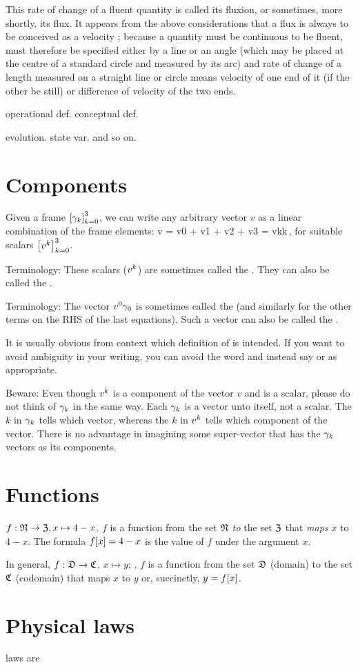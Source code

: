 This rate of change of a fluent quantity is called its fluxion, or sometimes, more shortly, its flux. It appears from the above considerations that a flux is always to be conceived as a velocity ; because a quantity must be continuous to be fluent, must therefore be specified either by a line or an angle (which may be placed at the centre of a standard circle and measured by its arc) and rate of change of a length measured on a straight line or circle means velocity of one end of it (if the other be still) or difference of velocity of the two ends.

operational def. conceptual def.

evolution. state var. and so on.


\section{Components}
%
Given a frame $\left[{\gamma_{k}}\right]_{k = 0}^{3}$, we can write any arbitrary vector $v$ as a linear combination of the frame elements:
%
\beq
  v = \ivec v0 + \ivec v1 + \ivec v2 + \ivec v3
    = \ivec vk\ifvec k\,,
\eeq
%
for suitable scalars $\left[{{v}^{k}}\right]_{k = 0}^{3}$.

Terminology: These scalars (${v}^{k}$) are sometimes called the . They can also be called the .

Terminology: The vector ${v}^{0}\gamma_{0}$ is sometimes called the  (and similarly for the other terms on the RHS of the last equations). Such a vector can also be called the .

It is usually obvious from context which definition of  is intended. If you want to avoid ambiguity in your writing, you can avoid the word  and instead say  or  as appropriate.

Beware: Even though ${v}^{k}$ is a component of the vector $v$ and is a scalar, please do not think of $\gamma_{k}$ in the same way. Each $\gamma_{k}$ is a vector unto itself, not a scalar. The $k$ in $\gamma_{k}$ tells which vector, whereas the $k$ in ${v}^{k}$ tells which component of the vector. There is no advantage in imagining some super-vector that has the $\gamma_{k}$ vectors as its components.


\section{Functions}
%
${f}:\mathfrak{N}\to\mathfrak{Z},{x}\mapsto{4-x}$. $f$ is a function from the set $\mathfrak{N}$ \emph{to} the set $\mathfrak{Z}$ that \emph{maps} $x$ to $4 - x$. The formula $f\!\left[{x}\right] = 4 - x$ is the value of $f$ under the argument $x$.

In general, $f:\mathfrak{D}\to\mathfrak{C}$, $x\mapsto y$; \ie, $f$ is a function from the set $\mathfrak{D}$ (domain) to the set $\mathfrak{C}$ (codomain) that maps $x$ to $y$ or, succinctly, $y = f\!\left[{x}\right]$.


\section{Physical laws}
%
laws are 

